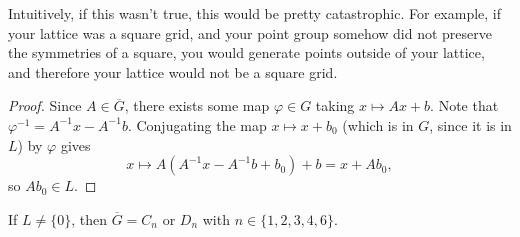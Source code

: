 Intuitively, if this wasn't true, this would be pretty catastrophic. For example, if your lattice was a square grid, and your point group somehow did not preserve the symmetries of a square, you would generate points outside of your lattice, and therefore your lattice would not be a square grid. 

\begin{proof}
Since $A\in \overline{G}$, there exists some map $\varphi\in G$ taking $x\mapsto Ax+b$. Note that $\varphi^{-1} = A^{-1}x-A^{-1}b$. Conjugating the map $x\mapsto x+b_0$ (which is in $G$, since it is in $L$) by $\varphi$ gives
\[x\mapsto A(A^{-1}x-A^{-1}b+b_0)+b = x+Ab_0,\]
so $Ab_0\in L$. 
\end{proof}

\begin{theorem}

If $L\neq \{0\}$, then $\overline{G} = C_n$ or $D_n$ with $n\in \{1,2,3,4,6\}$. 
\end{theorem}


